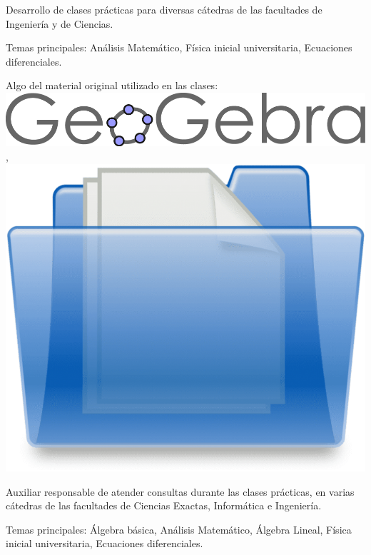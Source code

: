 \begin{zitemize}
\item Desarrollo de clases prácticas para diversas cátedras de las facultades de Ingeniería y de Ciencias.
\item Temas principales: Análisis Matemático, Física inicial universitaria, Ecuaciones diferenciales.
\item Algo del material original utilizado en las clases: \href{https://www.geogebra.org/u/juanjogervasio}{\includegraphics[scale=0.15]{Geogebra-logo.png}} , \href{https://drive.google.com/drive/folders/1O8sMBLMmO2oliVsF-9rBn2s2qDtSGJUr?usp=sharing}{\includegraphics[scale=0.01]{folder.png}}
\end{zitemize}

\begin{zitemize}
\item Auxiliar responsable de atender consultas durante las clases prácticas, en varias cátedras de las facultades de Ciencias Exactas, Informática e Ingeniería.
\item Temas principales: Álgebra básica, Análisis Matemático, Álgebra Lineal, Física inicial universitaria, Ecuaciones diferenciales.
\end{zitemize}

